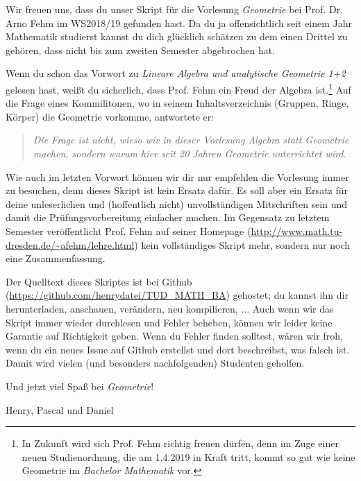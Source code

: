 Wir freuen uns, dass du unser Skript für die Vorlesung \textit{Geometrie} bei Prof. Dr. Arno Fehm im WS2018/19 gefunden hast. Da du ja offensichtlich seit einem Jahr Mathematik studierst kannst du dich glücklich schätzen zu dem einen Drittel zu gehören, dass nicht bis zum zweiten Semester abgebrochen hat.

Wenn du schon das Vorwort zu \textit{Lineare Algebra und analytische Geometrie 1+2} gelesen hast, weißt du sicherlich, dass Prof. Fehm ein Freud der Algebra ist.\footnote{In Zukunft wird sich Prof. Fehm richtig freuen dürfen, denn im Zuge einer neuen Studienordnung, die am 1.4.2019 in Kraft tritt, kommt so gut wie keine Geometrie im \textit{Bachelor Mathematik} vor.} Auf die Frage eines Kommilitonen, wo in seinem Inhaltsverzeichnis (Gruppen, Ringe, Körper) die Geometrie vorkomme, antwortete er:
\begin{quote}
	\textit{Die Frage ist nicht, wieso wir in dieser Vorlesung Algebra statt Geometrie machen, sondern warum hier seit 20 Jahren Geometrie unterrichtet wird.}
\end{quote}

Wie auch im letzten Vorwort können wir dir nur empfehlen die Vorlesung immer zu besuchen, denn dieses Skript ist kein Ersatz dafür. Es soll aber ein Ersatz für deine unleserlichen und (hoffentlich nicht) unvollständigen Mitschriften sein und damit die Prüfungsvorbereitung einfacher machen. Im Gegensatz zu letztem Semester veröffentlicht Prof. Fehm auf seiner Homepage (\url{http://www.math.tu-dresden.de/~afehm/lehre.html}) kein vollständiges Skript mehr, sondern nur noch eine Zusammenfassung.

Der Quelltext dieses Skriptes ist bei Github (\url{https://github.com/henrydatei/TUD_MATH_BA}) gehostet; du kannst ihn dir herunterladen, anschauen, verändern, neu kompilieren, ... Auch wenn wir das Skript immer wieder durchlesen und Fehler beheben, können wir leider keine Garantie auf Richtigkeit geben. Wenn du Fehler finden solltest, wären wir froh, wenn du ein neues Issue auf Github erstellst und dort beschreibst, was falsch ist. Damit wird vielen (und besonders nachfolgenden) Studenten geholfen.

Und jetzt viel Spaß bei \textit{Geometrie}!

\begin{flushright}
	Henry, Pascal und Daniel
\end{flushright}